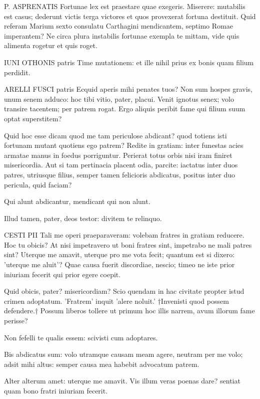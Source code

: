 \bigskip

P. ASPRENATIS Fortunae lex est praestare quae exegeris. Miserere: mutabilis est casus; dederunt victis terga victores et quos provexerat fortuna destituit. Quid referam Marium sexto consulatu Carthagini mendicantem, septimo Romae imperantem? Ne circa plura instabilis fortunae exempla te mittam, vide quis alimenta rogetur et quis roget. 	

\bigskip

IUNI OTHONIS patris Time mutationem: et ille nihil prius ex bonis quam filium perdidit.

\bigskip

ARELLI FUSCI patris Ecquid aperis mihi penates tuos? Non sum hospes gravis, unum senem adduco: hoc tibi vitio, pater, placui. Venit ignotus senex; volo transire tacentem; per patrem rogat. Ergo aliquis peribit fame qui filium suum optat superstitem? 

Quid hoc esse dicam quod me tam periculose abdicant? quod totiens isti fortunam mutant quotiens ego patrem? Redite in gratiam: inter funestas acies armatae manus in foedus porriguntur. Perierat totus orbis nisi iram finiret misericordia. Aut si tam pertinacia placent odia, parcite: iactatus inter duos patres, utriusque filius, semper tamen felicioris abdicatus, positus inter duo pericula, quid faciam? 

Qui alunt abdicantur, mendicant qui non alunt. 	

Illud tamen, pater, deos testor: divitem te relinquo.

\bigskip

CESTI PII Tali me operi praeparaveram: volebam fratres in gratiam reducere. Hoc tu obicis? At nisi impetravero ut boni fratres sint, impetrabo ne mali patres sint? Uterque me amavit, uterque pro me vota fecit; quantum est si dixero: 'uterque me aluit'? Quae causa fuerit discordiae, nescio; timeo ne iste prior iniuriam fecerit qui prior egere coepit. 

Quid obicis, pater? misericordiam? Scio quendam in hac civitate propter istud crimen adoptatum. 'Fratrem' inquit 'alere noluit.' 
†Invenisti quod possem defendere.† Possum liberos tollere ut primum hoc illis narrem, avum illorum fame perisse? 

Non fefelli te qualis essem: scivisti cum adoptares. 

Bis abdicatus sum: volo utramque causam meam agere, neutram per me volo; adsit mihi altus: semper causa mea habebit advocatum patrem. 

Alter alterum amet: uterque me amavit. Vis illum veras poenas dare? sentiat quam bono fratri iniuriam fecerit.

